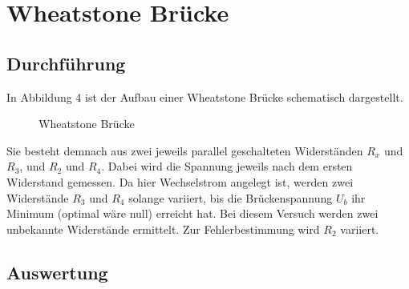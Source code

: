 \section{Wheatstone Brücke}
\label{sec:Wheatstone Brücke}

\subsection{Durchführung}
\label{subsec:Durchführung}

In Abbildung 4 ist der Aufbau einer Wheatstone Brücke schematisch dargestellt.

\begin{figure}
    \centering
    \caption{Wheatstone Brücke}
    \label{fig:Wheatstone Brücke}
\end{figure}

Sie besteht demnach aus zwei jeweils parallel geschalteten Widerständen
$R_x$ und $R_3$, und $R_2$ und $R_4$.
Dabei wird die Spannung jeweils nach dem ersten Widerstand gemessen.
Da hier Wechselstrom angelegt ist, werden zwei Widerstände $R_3$ und $R_4$
solange variiert, bis die Brückenspannung $U_b$ ihr Minimum (optimal wäre 
null) erreicht hat. Bei diesem Versuch
werden zwei unbekannte Widerstände ermittelt. Zur Fehlerbestimmung wird 
$R_2$ variiert.

\subsection{Auswertung}
\label{subsec:Auswertung}